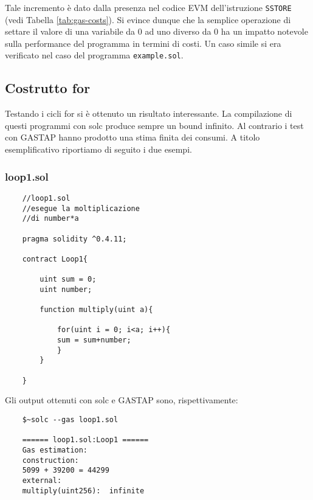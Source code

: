     
    Tale incremento è dato dalla presenza nel codice EVM dell'istruzione \texttt{SSTORE} (vedi Tabella \ref{tab:gas-costs}). Si evince dunque che la semplice operazione di settare il valore di una variabile da 0 ad uno diverso da 0 ha un impatto notevole sulla performance del programma in termini di costi. Un caso simile si era verificato nel caso del programma \verb|example.sol|.

    \subsection{Costrutto for}
    
    Testando i cicli for si è ottenuto un risultato interessante. La compilazione di questi programmi con solc produce sempre un bound infinito. Al contrario i test con GASTAP hanno prodotto una stima finita dei consumi. A titolo esemplificativo riportiamo di seguito i due esempi.
    
    \subsubsection{loop1.sol}
    
    \begin{minipage}{\linewidth}
    \begin{lstlisting}
    //loop1.sol
    //esegue la moltiplicazione
    //di number*a

    pragma solidity ^0.4.11;

    contract Loop1{

        uint sum = 0;
        uint number;
        
        function multiply(uint a){
            
            for(uint i = 0; i<a; i++){
            sum = sum+number;
            }
        }

    }
    \end{lstlisting}
    \end{minipage}

    Gli output ottenuti con solc e GASTAP sono, rispettivamente:
    
    \begin{minipage}{\linewidth}
    \begin{lstlisting}
    $~solc --gas loop1.sol
    
    ====== loop1.sol:Loop1 ======
    Gas estimation:
    construction:
    5099 + 39200 = 44299
    external:
    multiply(uint256):	infinite
    \end{lstlisting}
    \end{minipage}

